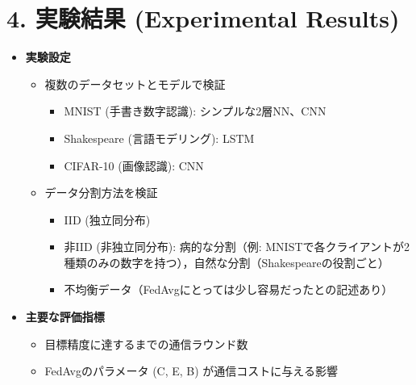 \documentclass[unicode,12pt,aspectratio=169, dvipdfmx]{beamer}
\begin{document}
\section{4. 実験結果 (Experimental Results)}
\begin{frame}{\insertsectionhead}
\begin{itemize}
    \item \textbf{実験設定}
    \begin{itemize}
        \item 複数のデータセットとモデルで検証
        \begin{itemize}
            \item MNIST (手書き数字認識): シンプルな2層NN、CNN
            \item Shakespeare (言語モデリング): LSTM
            \item CIFAR-10 (画像認識): CNN
        \end{itemize}
        \item データ分割方法を検証
        \begin{itemize}
            \item IID (独立同分布)
            \item 非IID (非独立同分布): 病的な分割（例: MNISTで各クライアントが2種類のみの数字を持つ），自然な分割（Shakespeareの役割ごと）
            \item 不均衡データ（FedAvgにとっては少し容易だったとの記述あり）
        \end{itemize}
    \end{itemize}
    \item \textbf{主要な評価指標}
    \begin{itemize}
        \item 目標精度に達するまでの通信ラウンド数
        \item FedAvgのパラメータ (C, E, B) が通信コストに与える影響
    \end{itemize}
\end{itemize}
\end{frame}
\end{document}
